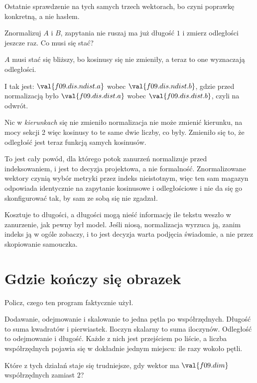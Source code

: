 \begin{fr}
Ostatnie sprawdzenie na tych samych trzech wektorach, bo czyni poprawkę
konkretną, a nie hasłem.

Znormalizuj $A$ i $B$, zapytania nie ruszaj \dash{} ma już długość $1$ \dash{}
i zmierz odległości jeszcze raz. Co musi się stać?
\nextframe
\end{fr}

\begin{fr}
\begin{ansblock}
$A$ musi stać się bliższy, bo kosinusy się nie zmieniły, a teraz to one
wyznaczają odległości.
\end{ansblock}

I tak jest: $\val{f09.dis.ndist.a}$ wobec $\val{f09.dis.ndist.b}$, gdzie przed
normalizacją było $\val{f09.dis.dist.a}$ wobec $\val{f09.dis.dist.b}$, czyli
na odwrót.

Nic w \emph{kierunkach} się nie zmieniło \dash{} normalizacja nie może zmienić
kierunku, na mocy sekcji 2 \dash{} więc kosinusy to te same dwie liczby, co
były. Zmieniło się to, że odległość jest teraz funkcją samych kosinusów.

\begin{aibox}
To jest cały powód, dla którego potok zanurzeń normalizuje przed indeksowaniem,
i jest to decyzja projektowa, a nie formalność. Znormalizowane wektory czynią
wybór metryki przez indeks nieistotnym, więc ten sam magazyn odpowiada
identycznie na zapytanie kosinusowe i odległościowe i nie da się go
skonfigurować tak, by sam ze sobą się nie zgadzał.

Kosztuje to długości, a długości mogą nieść informację \dash{} ile tekstu
weszło w zanurzenie, jak pewny był model. Jeśli niosą, normalizacja wyrzuca ją,
zanim indeks ją w ogóle zobaczy, i to jest decyzja warta podjęcia świadomie, a
nie przez skopiowanie samouczka.
\end{aibox}
\end{fr}

\section{Gdzie kończy się obrazek}
\label{sec:F09-highdim}

\begin{fr}
Policz, czego ten program faktycznie użył.

Dodawanie, odejmowanie i skalowanie to jedna pętla po współrzędnych. Długość
to suma kwadratów i pierwiastek. Iloczyn skalarny to suma iloczynów. Odległość
to odejmowanie i długość. Każde z nich jest przejściem po liście, a liczba
współrzędnych pojawia się w dokładnie jednym miejscu: ile razy wokoło pętli.

Które z tych działań staje się trudniejsze, gdy wektor ma $\val{f09.dim}$
współrzędnych zamiast $2$?
\nextframe
\end{fr}

